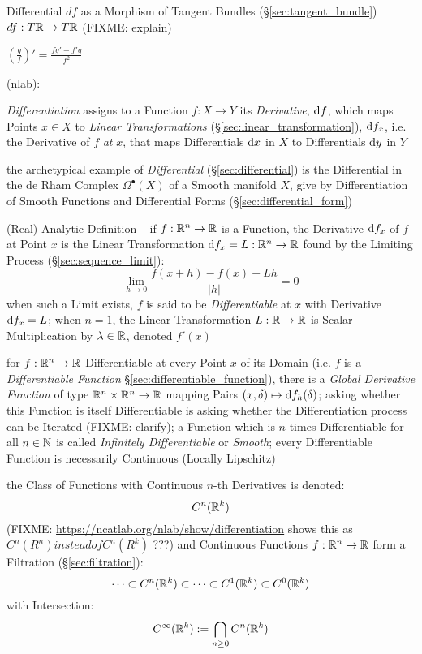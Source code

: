 Differential $df$ as a Morphism of Tangent Bundles (\S\ref{sec:tangent_bundle})
$df : T\mathbb{R} \rightarrow T\mathbb{R}$ (FIXME: explain)

\asterism

$(\frac{g}{f})' = \frac{f g' - f' g}{f^2}$

\asterism

(nlab):

\emph{Differentiation} assigns to a Function $f : X \rightarrow Y$ its
\emph{Derivative}, $\mathrm{d}f$, which maps Points $x \in X$ to \emph{Linear
  Transformations} (\S\ref{sec:linear_transformation}), $\mathrm{d}f_x$, i.e. the
Derivative of $f$ \emph{at} $x$, that maps Differentials $\mathrm{d}x$ in $X$ to
Differentials $\mathrm{d}y$ in $Y$

\fist the archetypical example of \emph{Differential} (\S\ref{sec:differential})
is the Differential in the de Rham Complex $\Omega^\bullet(X)$ of a Smooth
manifold $X$, give by Differentiation of Smooth Functions and Differential Forms
(\S\ref{sec:differential_form})

(Real) Analytic Definition -- if $f : \mathbb{R}^n \rightarrow \mathbb{R}$ is a
Function, the Derivative $\mathrm{d}f_x$ of $f$ at Point $x$ is the Linear
Transformation $\mathrm{d}f_x = L : \mathbb{R}^n \rightarrow \mathbb{R}$ found by the
Limiting Process (\S\ref{sec:sequence_limit}):
\[
  \lim_{h\rightarrow{0}} \frac{f(x + h) - f(x) - Lh}{|h|} = 0
\]
when such a Limit exists, $f$ is said to be \emph{Differentiable} at $x$ with
Derivative $\mathrm{d}f_x = L$; when $n=1$, the Linear Transformation $L : \mathbb{R}
\rightarrow \mathbb{R}$ is Scalar Multiplication by $\lambda \in \mathbb{R}$, denoted
$f'(x)$

for $f : \mathbb{R}^n \rightarrow \mathbb{R}$ Differentiable at every Point $x$ of its
Domain (i.e. $f$ is a \emph{Differentiable Function}
\S\ref{sec:differentiable_function}), there is a \emph{Global Derivative
  Function} of type $\mathbb{R}^n \times \mathbb{R}^n \rightarrow \mathbb{R}$ mapping Pairs
$(x,\delta) \mapsto \mathrm{d}f_h(\delta)$; asking whether this Function is itself
Differentiable is asking whether the Differentiation process can be Iterated
(FIXME: clarify); a Function which is $n$-times Differentiable for all $n \in
\mathbb{N}$ is called \emph{Infinitely Differentiable} or \emph{Smooth}; every
Differentiable Function is necessarily Continuous (Locally Lipschitz)

the Class of Functions with Continuous $n$-th Derivatives is denoted:
\[
  C^n(\mathbb{R}^k)
\]
(FIXME: \url{https://ncatlab.org/nlab/show/differentiation} shows this as
$C^n(R^n) instead of C^n(R^k)$ ???)
and Continuous Functions $f : \mathbb{R}^n \rightarrow \mathbb{R}$ form a Filtration
(\S\ref{sec:filtration}):
\[
  \cdots \subset C^n(\mathbb{R}^k) \subset \cdots \subset C^1(\mathbb{R}^k) \subset
    C^0(\mathbb{R}^k)
\]
with Intersection:
\[
  C^\infty(\mathbb{R}^k) := \bigcap_{n\geq{0}} C^n(\mathbb{R}^k)
\]

